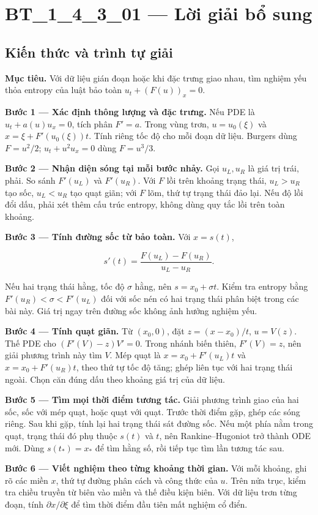 \documentclass[10pt,a4paper]{article}
\begin{document}
\section*{BT\_1\_4\_3\_01 — Lời giải bổ sung}
\subsection*{Kiến thức và trình tự giải}
\textbf{Mục tiêu.} Với dữ liệu gián đoạn hoặc khi đặc trưng giao nhau, tìm nghiệm yếu thỏa entropy của luật bảo toàn $u_t+(F(u))_x=0$.

\textbf{Bước 1 — Xác định thông lượng và đặc trưng.} Nếu PDE là $u_t+a(u)u_x=0$, tích phân $F'=a$. Trong vùng trơn, $u=u_0(\xi)$ và $x=\xi+F'(u_0(\xi))t$. Tính riêng tốc độ cho mỗi đoạn dữ liệu. Burgers dùng $F=u^2/2$; $u_t+u^2u_x=0$ dùng $F=u^3/3$.

\textbf{Bước 2 — Nhận diện sóng tại mỗi bước nhảy.} Gọi $u_L,u_R$ là giá trị trái, phải. So sánh $F'(u_L)$ và $F'(u_R)$. Với $F$ lồi trên khoảng trạng thái, $u_L>u_R$ tạo sốc, $u_L<u_R$ tạo quạt giãn; với $F$ lõm, thứ tự trạng thái đảo lại. Nếu độ lồi đổi dấu, phải xét thêm cấu trúc entropy, không dùng quy tắc lồi trên toàn khoảng.

\textbf{Bước 3 — Tính đường sốc từ bảo toàn.} Với $x=s(t)$,

\[
s'(t)=\frac{F(u_L)-F(u_R)}{u_L-u_R}.
\]

Nếu hai trạng thái hằng, tốc độ $\sigma$ hằng, nên $s=x_0+\sigma t$. Kiểm tra entropy bằng $F'(u_R)<\sigma<F'(u_L)$ đối với sốc nén có hai trạng thái phân biệt trong các bài này. Giá trị ngay trên đường sốc không ảnh hưởng nghiệm yếu.

\textbf{Bước 4 — Tính quạt giãn.} Từ $(x_0,0)$, đặt $z=(x-x_0)/t$, $u=V(z)$. Thế PDE cho $(F'(V)-z)V'=0$. Trong nhánh biến thiên, $F'(V)=z$, nên giải phương trình này tìm $V$. Mép quạt là $x=x_0+F'(u_L)t$ và $x=x_0+F'(u_R)t$, theo thứ tự tốc độ tăng; ghép liên tục với hai trạng thái ngoài. Chọn căn đúng dấu theo khoảng giá trị của dữ liệu.

\textbf{Bước 5 — Tìm mọi thời điểm tương tác.} Giải phương trình giao của hai sốc, sốc với mép quạt, hoặc quạt với quạt. Trước thời điểm gặp, ghép các sóng riêng. Sau khi gặp, tính lại hai trạng thái sát đường sốc. Nếu một phía nằm trong quạt, trạng thái đó phụ thuộc $s(t)$ và $t$, nên Rankine–Hugoniot trở thành ODE mới. Dùng $s(t_*)=x_*$ để tìm hằng số, rồi tiếp tục tìm lần tương tác sau.

\textbf{Bước 6 — Viết nghiệm theo từng khoảng thời gian.} Với mỗi khoảng, ghi rõ các miền $x$, thứ tự đường phân cách và công thức của $u$. Trên nửa trục, kiểm tra chiều truyền từ biên vào miền và thế điều kiện biên. Với dữ liệu trơn từng đoạn, tính $\partial x/\partial\xi$ để tìm thời điểm đầu tiên mất nghiệm cổ điển.
\end{document}
